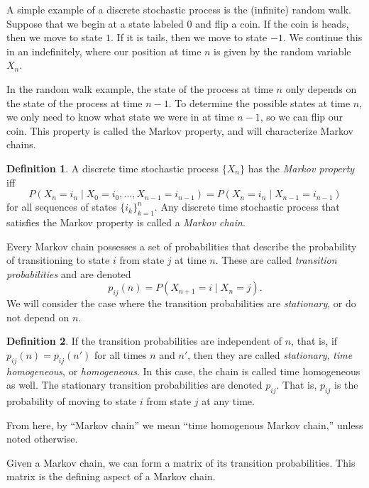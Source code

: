 \documentclass[12pt]{article}
\theoremstyle{definition}
\newtheorem{defn}{Definition}
\begin{document}
A simple example of a discrete stochastic process is the (infinite) random
walk. Suppose that we begin at a state labeled $0$ and flip a coin. If the coin
is heads, then we move to state $1$. If it is tails, then we move to state
$-1$. We continue this in an indefinitely, where our position at time $n$ is
given by the random variable $X_n$.

In the random walk example, the state of the process at time $n$ only depends
on the state of the process at time $n - 1$. To determine the possible states
at time $n$, we only need to know what state we were in at time $n - 1$, so we
can flip our coin. This property is called the Markov property, and will
characterize Markov chains.

\begin{defn}
    \label{defn:markov-prop}
    A discrete time stochastic process $\{X_n\}$ has the \emph{Markov property}
    iff $$P(X_n = i_n \mid X_0 = i_0, \dots, X_{n - 1} = i_{n - 1}) = P(X_n =
    i_n \mid X_{n - 1} = i_{n - 1})$$ for all sequences of states $\{i_k\}_{k =
    1}^n$. Any discrete time stochastic process that satisfies the Markov
    property is called a \emph{Markov chain}.
\end{defn}

Every Markov chain possesses a set of probabilities that describe the
probability of transitioning to state $i$ from state $j$ at time $n$. These are
called \emph{transition probabilities} and are denoted $$p_{ij}(n) = P(X_{n +
1} = i \mid X_n = j).$$ We will consider the case where the transition
probabilities are \emph{stationary}, or do not depend on $n$.

\begin{defn}
    \label{defn:trans-prob}
    If the transition probabilities are independent of $n$, that is, if
    $p_{ij}(n) = p_{ij}(n')$ for all times $n$ and $n'$, then they are called
    \emph{stationary}, \emph{time homogeneous}, or \emph{homogeneous}. In this
    case, the chain is called time homogeneous as well. The stationary
    transition probabilities are denoted $p_{ij}$. That is, $p_{ij}$ is the
    probability of moving to state $i$ from state $j$ at any time.
\end{defn}

From here, by ``Markov chain'' we mean ``time homogenous Markov chain,'' unless
noted otherwise.

Given a Markov chain, we can form a matrix of its transition probabilities.
This matrix is the defining aspect of a Markov chain.
\end{document}
